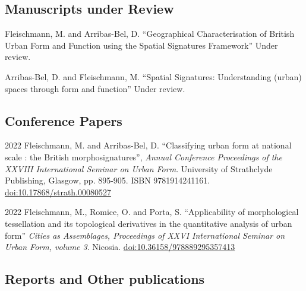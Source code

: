 \documentclass[12pt,a4paper]{report}
\begin{document}
    \subsection*{Manuscripts under Review}

    \begin{tablist}

        \item[\the\year] \tab{}Fleischmann, M. and Arribas-Bel, D. \enquote{Geographical Characterisation of British Urban Form and Function using the Spatial Signatures Framework} Under review.

        \item[\the\year] \tab{}Arribas-Bel, D. and Fleischmann, M. \enquote{Spatial Signatures: Understanding (urban) spaces through form and function} Under review.

    \end{tablist}

    \subsection*{Conference Papers}

    \begin{tablist}

        \item[2022] \tab{}Fleischmann, M. and Arribas-Bel, D. \enquote{Classifying urban form at national scale : the British morphosignatures}, \textit{Annual Conference Proceedings of the XXVIII International Seminar on Urban Form}. University of Strathclyde Publishing, Glasgow, pp. 895-905. ISBN 9781914241161. \href{https://doi.org/10.17868/strath.00080527}{doi:10.17868/strath.00080527}

        \item[2022] \tab{}Fleischmann, M., Romice, O. and Porta, S. \enquote{Applicability of morphological tessellation and its topological derivatives in the quantitative analysis of urban form} \textit{Cities as Assemblages, Proceedings of XXVI International Seminar on Urban Form, volume 3}. Nicosia. \href{https://doi.org/10.36158/978889295357413}{doi:10.36158/978889295357413}

    \end{tablist}

    \subsection*{Reports and Other publications}
\end{document}

